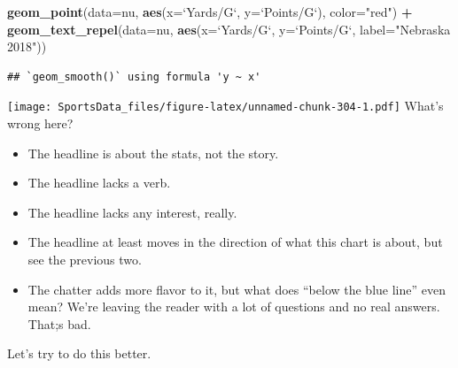 \documentclass[
]{book}
\newenvironment{Shaded}{\begin{snugshade}}{\end{snugshade}}
\newcommand{\DataTypeTok}[1]{\textcolor[rgb]{0.13,0.29,0.53}{#1}}
\newcommand{\KeywordTok}[1]{\textcolor[rgb]{0.13,0.29,0.53}{\textbf{#1}}}
\newcommand{\NormalTok}[1]{#1}
\newcommand{\OperatorTok}[1]{\textcolor[rgb]{0.81,0.36,0.00}{\textbf{#1}}}
\newcommand{\StringTok}[1]{\textcolor[rgb]{0.31,0.60,0.02}{#1}}
\providecommand{\tightlist}{%
  \setlength{\itemsep}{0pt}\setlength{\parskip}{0pt}}
\begin{document}
\begin{Shaded}
\begin{Highlighting}[]
\StringTok{  }\KeywordTok{geom_point}\NormalTok{(}\DataTypeTok{data=}\NormalTok{nu, }\KeywordTok{aes}\NormalTok{(}\DataTypeTok{x=}\StringTok{`}\DataTypeTok{Yards/G}\StringTok{`}\NormalTok{, }\DataTypeTok{y=}\StringTok{`}\DataTypeTok{Points/G}\StringTok{`}\NormalTok{), }\DataTypeTok{color=}\StringTok{"red"}\NormalTok{) }\OperatorTok{+}\StringTok{ }
\StringTok{  }\KeywordTok{geom_text_repel}\NormalTok{(}\DataTypeTok{data=}\NormalTok{nu, }\KeywordTok{aes}\NormalTok{(}\DataTypeTok{x=}\StringTok{`}\DataTypeTok{Yards/G}\StringTok{`}\NormalTok{, }\DataTypeTok{y=}\StringTok{`}\DataTypeTok{Points/G}\StringTok{`}\NormalTok{, }\DataTypeTok{label=}\StringTok{"Nebraska 2018"}\NormalTok{))}
\end{Highlighting}
\end{Shaded}

\begin{verbatim}
## `geom_smooth()` using formula 'y ~ x'
\end{verbatim}

\texttt{[image: SportsData\_files/figure-latex/unnamed-chunk-304-1.pdf]}
What's wrong here?

\begin{itemize}
\tightlist
\item
  The headline is about the stats, not the story.
\item
  The headline lacks a verb.
\item
  The headline lacks any interest, really.
\item
  The headline at least moves in the direction of what this chart is about, but see the previous two.
\item
  The chatter adds more flavor to it, but what does ``below the blue line'' even mean? We're leaving the reader with a lot of questions and no real answers. That;s bad.
\end{itemize}

Let's try to do this better.
\end{document}
